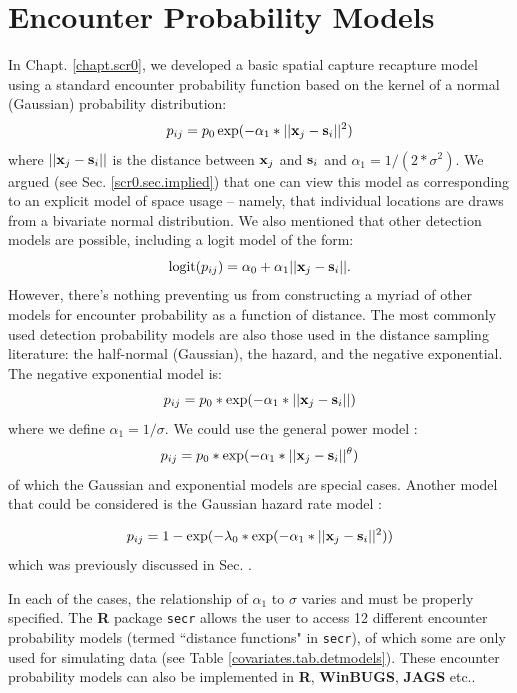 \section{Encounter Probability Models}
\label{covs.sec.detfunc}

In Chapt. \ref{chapt.scr0}, we developed a basic spatial capture
recapture model using a standard encounter probability function based on the kernel
of a normal (Gaussian) probability distribution:
\[
p_{ij} = p_{0} \exp(-\alpha_{1} *||{\bf x}_{j}-{\bf s}_{i}||^2)
\]
where $||{\bf x}_{j}-{\bf s}_{i}||$ is the distance between ${\bf
  x}_{j}$ and ${\bf s}_{i}$ and $\alpha_{1} = 1/(2*\sigma^2)$.  We
argued (see Sec. \ref{scr0.sec.implied}) that one can view this model
as corresponding to an explicit model of space usage -- namely, that
individual locations are draws from a bivariate normal
distribution. We also mentioned that other detection models are
possible, including a logit model of the form:
\begin{equation}
	\mbox{logit}(p_{ij}) = \alpha_{0} + \alpha_1 ||{\bf x}_{j}-{\bf s}_{i} ||.
\label{covariates.eq.logit}
\end{equation}
However, there's nothing preventing us from constructing a myriad of
other models for encounter probability as a function of distance.  The
most commonly used detection probability models are also those used in
the distance sampling literature: the half-normal (Gaussian), the
hazard, and the negative exponential.  The negative exponential model
is:
\[
p_{ij} = p_{0}*\exp(-\alpha_{1} *||{\bf x}_{j}-{\bf s}_{i}||)
\]
where we define
$\alpha_{1} = 1/\sigma$.
We could use the general power model \citep{russell_etal:2012}: 
\[
p_{ij} = p_0*\exp(-\alpha_{1} *||{\bf x}_{j}-{\bf s}_{i}||^{\theta} )
\]
of which the
Gaussian and exponential models are special cases.  Another model that
could be considered is the Gaussian hazard rate model \citep{hayes_buckland:1983}:

\[
p_{ij} = 1-\exp(-\lambda_{0}* \exp(-\alpha_{1} *||{\bf x}_{j}-{\bf
  s}_{i}||^{2}) )
\]
which was previously discussed in Sec. \label{scr0.sec.binomial}.


In each of the cases, the relationship of $\alpha_1$ to $\sigma$
varies and must be properly specified.  The {\bf R} package {\tt secr}
allows the user to access 12 different encounter probability models
(termed ``distance functions" in {\tt secr}), of which some are only
used for simulating data (see Table
\ref{covariates.tab.detmodels}). These encounter probability models
can also be implemented in {\bf R}, {\bf WinBUGS}, {\bf JAGS} etc..


